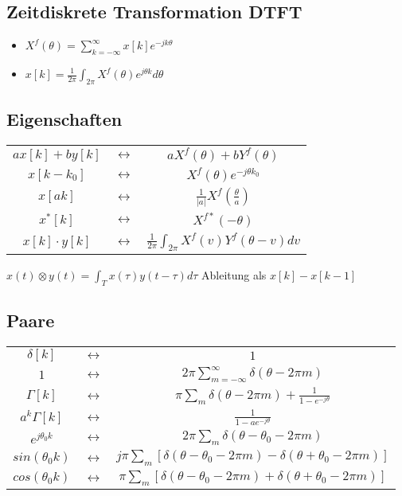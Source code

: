 \documentclass{article}
\begin{document}
\subsection{Zeitdiskrete Transformation DTFT}
\begin{itemize}
\item $X^f(\theta) = \sum_{k=-\infty}^\infty x[k]e^{-jk\theta}$
\item $x[k] = \frac{1}{2\pi} \int_{2\pi} X^f(\theta) e^{j\theta k} d\theta$
\end{itemize}


\subsection{Eigenschaften}
\begin{tabular} { c c c}
$ax[k]+by[k]$ & $\leftrightarrow$ & $aX^f(\theta)+bY^f(\theta)$ \\
$x[k-k_0]$ & $\leftrightarrow$ & $X^f(\theta)e^{-j\theta k_0}$ \\
$x[ak]$ & $\leftrightarrow$ & $\frac{1}{|a|}X^f(\frac{\theta}{a})$ \\
$x^*[k]$ & $\leftrightarrow$ & $X^{f*}(-\theta)$ \\
$x[k]\cdot y[k] $ & $\leftrightarrow$ & $\frac{1}{2\pi} \int_{2\pi}X^f(v)Y^f(\theta-v) dv $ \\
\end{tabular} \newline
$x(t)\otimes y(t)= \int_T x(\tau)y(t-\tau) d\tau$ \newline
Ableitung als $ x[k]-x[k-1]$

\subsection{Paare}
\begin{tabular}{ c c c }
$\delta[k]$ & $\leftrightarrow$ & $1$\\
$1$ & $\leftrightarrow$ & $2\pi\sum_{m=-\infty}^\infty \delta(\theta -2\pi m)$\\
$\Gamma[k]$ & $\leftrightarrow$ & $\pi\sum_m\delta(\theta -2\pi m)+\frac{1}{1-e^{-j\theta}}$\\
$a^k\Gamma[k]$ & $\leftrightarrow$ & $\frac{1}{1-ae^{-j\theta}}$\\
$e^{j\theta_0k}$ & $\leftrightarrow$ & $2\pi\sum_m \delta(\theta -\theta_0 -2\pi m)$\\
$sin(\theta_0 k)$ & $\leftrightarrow$ & $j\pi\sum_m[\delta(\theta -\theta_0 -2\pi m)-\delta(\theta +\theta_0 -2\pi m)]$\\
$cos(\theta_0k)$ & $\leftrightarrow$ & $\pi\sum_m[\delta(\theta -\theta_0 -2\pi m)+\delta(\theta +\theta_0 -2\pi m)]$\\

\end{tabular}
\end{document}
